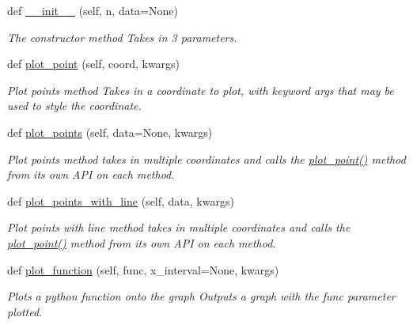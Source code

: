 \begin{DoxyCompactItemize}
\item 
def \hyperlink{class_graph_1_1_graph_af0cdc046d29cdf27c5f94445132d7cd8}{\+\_\+\+\_\+init\+\_\+\+\_\+} (self, n, data=None)
\begin{DoxyCompactList}\small\item\em The constructor method Takes in 3 parameters. \end{DoxyCompactList}\item 
def \hyperlink{class_graph_1_1_graph_ad52308b6029d41678a23df1f40baa81e}{plot\+\_\+point} (self, coord, kwargs)
\begin{DoxyCompactList}\small\item\em Plot points method Takes in a coordinate to plot, with keyword args that may be used to style the coordinate. \end{DoxyCompactList}\item 
def \hyperlink{class_graph_1_1_graph_ad01b52cd4d978eb49b257b2af5caffc0}{plot\+\_\+points} (self, data=None, kwargs)
\begin{DoxyCompactList}\small\item\em Plot points method takes in multiple coordinates and calls the \hyperlink{class_graph_1_1_graph_ad52308b6029d41678a23df1f40baa81e}{plot\+\_\+point()} method from its own A\+PI on each method. \end{DoxyCompactList}\item 
def \hyperlink{class_graph_1_1_graph_ae10db019dca4a470d6c03b86984fc667}{plot\+\_\+points\+\_\+with\+\_\+line} (self, data, kwargs)
\begin{DoxyCompactList}\small\item\em Plot points with line method takes in multiple coordinates and calls the \hyperlink{class_graph_1_1_graph_ad52308b6029d41678a23df1f40baa81e}{plot\+\_\+point()} method from its own A\+PI on each method. \end{DoxyCompactList}\item 
def \hyperlink{class_graph_1_1_graph_a2a9994035c4419c6ff72d675ef85823c}{plot\+\_\+function} (self, func, x\+\_\+interval=None, kwargs)
\begin{DoxyCompactList}\small\item\em Plots a python function onto the graph Outputs a graph with the func parameter plotted. \end{DoxyCompactList}\end{DoxyCompactItemize}
